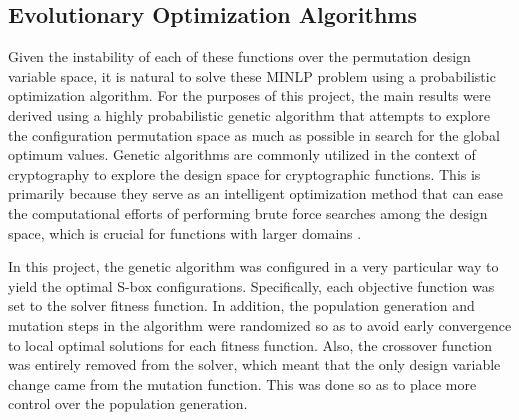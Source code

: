 \documentclass[11pt]{article}
\begin{document}
\subsection{Evolutionary Optimization Algorithms}

Given the instability of each of these functions over the permutation design variable space, it is natural to solve these MINLP problem using a probabilistic optimization algorithm. For the purposes of this project, the main results were derived using a highly probabilistic genetic algorithm that attempts to explore the configuration permutation space as much as possible in search for the global optimum values. Genetic algorithms are commonly utilized in the context of cryptography to explore the design space for cryptographic functions. This is primarily because they serve as an intelligent optimization method that can ease the computational efforts of performing brute force searches among the design space, which is crucial for functions with larger domains \cite{Skein}.

In this project, the genetic algorithm was configured in a very particular way to yield the optimal S-box configurations. Specifically, each objective function was set to the solver fitness function. In addition, the population generation and mutation steps in the algorithm were randomized so as to avoid early convergence to local optimal solutions for each fitness function. Also, the crossover function was entirely removed from the solver, which meant that the only design variable change came from the mutation function. This was done so as to place more control over the population generation. 

\end{document}
